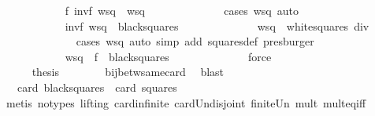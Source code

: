 \begin{isabellebody}
\ \ \ \ \ \ \ \ \ \ \isamarkupfalse%
\ {\isachardoublequoteopen}{\isacharquery}f\ {\isacharparenleft}{\isacharquery}invf\ wsq{\isacharparenright}\ {\isacharequal}\ wsq{\isachardoublequoteclose}\isanewline
\ \ \ \ \ \ \ \ \ \ \ \ \isamarkupfalse%
\ {\isacharparenleft}cases\ wsq{\isacharcomma}\ auto{\isacharparenright}\isanewline
\ \ \ \ \ \ \ \ \ \ \isamarkupfalse%
\isanewline
\ \ \ \ \ \ \ \ \ \ \isamarkupfalse%
\ {\isachardoublequoteopen}{\isacharquery}invf\ wsq\ {\isasymin}\ {\isacharquery}black{\isacharunderscore}squares{\isachardoublequoteclose}\isanewline
\ \ \ \ \ \ \ \ \ \ \ \ \isamarkupfalse%
\ {\isacharbackquoteopen}wsq\ {\isasymin}\ {\isacharquery}white{\isacharunderscore}squares{\isacharbackquoteclose}\ div{}\isanewline
\ \ \ \ \ \ \ \ \ \ \ \ \isamarkupfalse%
\ {\isacharparenleft}cases\ wsq{\isacharcomma}\ auto\ simp\ add{\isacharcolon}\ squares{\isacharunderscore}def{\isacharparenright}\ presburger{\isacharplus}\isanewline
\ \ \ \ \ \ \ \ \ \ \isamarkupfalse%
\isanewline
\ \ \ \ \ \ \ \ \ \ \isamarkupfalse%
\ {\isachardoublequoteopen}wsq\ {\isasymin}\ {\isacharquery}f\ {\isacharbackquote}\ {\isacharquery}black{\isacharunderscore}squares{\isachardoublequoteclose}\isanewline
\ \ \ \ \ \ \ \ \ \ \ \ \isamarkupfalse%
\ force\isanewline
\ \ \ \ \ \ \ \ \isamarkupfalse%
\isanewline
\ \ \ \ \ \ \isamarkupfalse%
\isanewline
\ \ \ \ \isamarkupfalse%
\isanewline
\ \ \ \ \isamarkupfalse%
\ {\isacharquery}thesis\isanewline
\ \ \ \ \ \ \isamarkupfalse%
\ bij{\isacharunderscore}betw{\isacharunderscore}same{\isacharunderscore}card\ \isamarkupfalse%
\ blast\isanewline
\ \ \isamarkupfalse%
\isanewline
\ \ \isamarkupfalse%
\isanewline
\ \ \isamarkupfalse%
\ {\isachardoublequoteopen}{}\ {\isacharasterisk}\ card\ {\isacharquery}black{\isacharunderscore}squares\ {\isacharequal}\ card\ squares{\isachardoublequoteclose}\isanewline
\ \ \ \ \isamarkupfalse%
\ {\isacharparenleft}metis\ {\isacharparenleft}no{\isacharunderscore}types{\isacharcomma}\ lifting{\isacharparenright}\ card{\isachardot}infinite\ card{\isacharunderscore}Un{\isacharunderscore}disjoint\ finite{\isacharunderscore}Un\ mult{\isacharunderscore}{}\ mult{\isacharunderscore}eq{\isacharunderscore}{}{\isacharunderscore}iff{\isacharparenright}\isanewline

\end{isabellebody}
